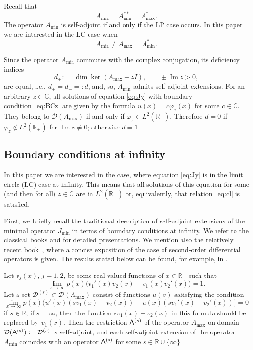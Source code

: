\documentclass[pdftex]{sigma}%
\numberwithin{equation}{section}
\begin{document}
 Recall that
\[
 A_{\min}= A_{\min}^{**} = A_{\max}^{*}.
 \]
 The operator $A_{\min}$ is self-adjoint if and only if the LP case occurs.
 In this paper we are interested in the LC case when
 \begin{equation}
 A_{\min}\neq A_{\max}=A_{\min}^*.
 \label{eq:cl}\end{equation}

Since the operator $A_{\min} $ commutes with the complex conjugation, its deficiency indices
 \[
 d_{\pm}: =\dim\ker (A_{\max}-z I),\qquad \pm \operatorname{Im} z>0,
 \]
 are equal, i.e., $d_{+} =d_{-}=:d $, and, so, $A_{\min} $ admits self-adjoint extensions. For an arbitrary $z\in{\mathbb C}$, all solutions of equation \eqref{eq:Jy} with boundary condition~\eqref{eq:BCz}
 are given by the formula $u (x)= c \varphi_{z}(x)$ for some $c\in{\mathbb C}$. They belong to $ {\mathcal D} (A_{\max})$ if and only if $\varphi_{z} \in L^2 ({\mathbb R}_{+})$. Therefore $d=0$ if $\varphi_{z} \not\in L^2 ({\mathbb R}_{+})$ for $\operatorname{Im} z\neq 0$; otherwise $d=1$.

\subsection{Boundary conditions at infinity}\label{section2.3}

 In this paper we are interested in the case, where equation \eqref{eq:Jy} is in the limit circle (LC) case at infinity. This means that all solutions of this equation for some (and then for all) $z\in{\mathbb C}$ are in $L^2({\mathbb R}_{+})$ or, equivalently, that relation~\eqref{eq:cl} is satisfied.

First, we briefly recall the traditional description of self-adjoint extensions of the minimal operator $J_{\min}$ in terms of boundary conditions at infinity.
 We refer to the classical books \cite[Chapter~IX, Section~4]{CoLe} and \cite[Section~18]{Nai} for detailed presentations. We mention also the relatively recent book~\cite{Schm}, where a concise exposition of the case of second-order differential operators is given. The results stated below can be found, for example, in \cite[Proposition~15.14]{Schm}.

 Let $v_{j}(x)$, $j=1,2$, be some real valued functions of $x\in{\mathbb R}_{+}$ such that
 \begin{equation}
 \lim_{x\to\infty} p(x) \big(v_{1}'(x) v_2 (x)- v_{1}(x) v_{2}'(x)\big)=1.
 \label{eq:bc1}\end{equation}
 Let a set ${\mathcal D}^{(s)} \subset {\mathcal D} ( A_{\max})$ consist of functions $u(x)$ satisfying the condition
 \begin{equation}
 \lim_{x\to\infty} p(x) \big(u'(x) (s v_{1}(x) + v_{2}(x))- u(x) (s v_{1}'(x) + v_{2}'(x))\big)=0
 \label{eq:bc}\end{equation}
 if $s\in{\mathbb R}$; if $s=\infty $, then the function $s v_{1}(x) + v_{2}(x)$ in this formula should be replaced by~$v_{1} (x)$.
 Then the restriction ${\sf A}^{(s)}$ of the operator $ A_{\max}$ on domain $ {\mathcal D} ({\sf A}^{(s)}):= {\mathcal D}^{(s)} $ is self-adjoint, and each self-adjoint extension of the operator $ A_{\min}$ coincides with an operator
 ${\sf A}^{(s)}$ for some $s\in{\mathbb R}\cup\{\infty\}$.
\end{document}
